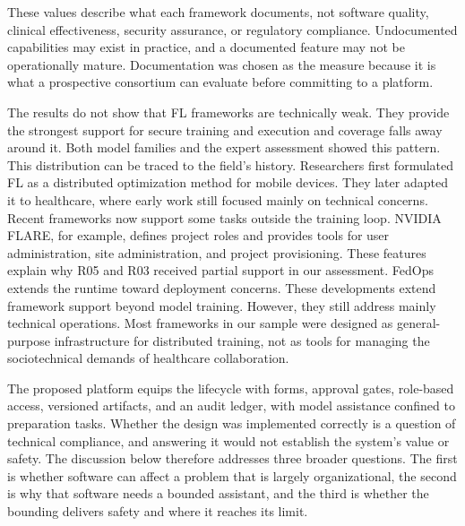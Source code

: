 \documentclass[preprint,5p, 10pt, times]{elsarticle}
\begin{document}
These values describe what each framework documents, not software quality,
clinical effectiveness, security assurance, or regulatory compliance.
Undocumented capabilities may exist in practice, and a documented feature
may not be operationally mature. Documentation was chosen as the measure
because it is what a prospective consortium can evaluate before committing
to a platform.

The results do not show that FL frameworks are technically weak. They provide the strongest support for secure training and execution and coverage falls away around it. Both model families and the expert assessment showed this pattern.
%
This distribution can be traced to the field's history. Researchers first formulated FL as a distributed optimization method for mobile devices\cite{mcmahan2017communication}. They later adapted it to healthcare, where early work still focused mainly on technical concerns.
%
Recent frameworks now support some tasks outside the training loop. NVIDIA FLARE\cite{roth2022nvidia}, for example, defines project roles and provides tools for user administration, site administration, and project provisioning. These features explain why R05 and R03 received partial support in our assessment. FedOps\cite{moon2024fedops} extends the runtime toward deployment concerns.
%
These developments extend framework support beyond model training. However, they still address mainly technical operations. 
Most frameworks in our sample were designed as general-purpose infrastructure for distributed training, not as tools for managing the sociotechnical demands of healthcare collaboration. 

The proposed platform equips the lifecycle with forms, approval gates, role-based access, versioned artifacts, and an audit ledger, with model assistance confined to preparation tasks. 
%
Whether the design was implemented correctly is a question of technical compliance, and answering it would not establish the system's value or safety.
%
The discussion below therefore addresses three broader questions. The first is whether software can affect a problem that is largely organizational, the second is why that software needs a bounded assistant, and the third is whether the bounding delivers safety and where it reaches its limit.
\end{document}
